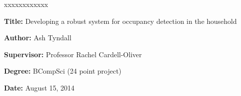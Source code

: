 \documentclass[../thesis/thesis.tex]{subfiles}
\begin{document}

\begin{namelist}{xxxxxxxxxxxx}
\item[{\bf Title:}]
	Developing a robust system for occupancy detection in the household
\item[{\bf Author:}]
	Ash Tyndall
\item[{\bf Supervisor:}]
	Professor Rachel Cardell-Oliver
\item[{\bf Degree:}]
	BCompSci (24 point project)
\item[{\bf Date:}]
	August 15, 2014
\end{namelist}
\end{document}
